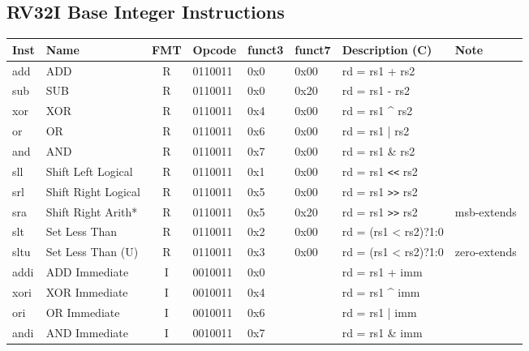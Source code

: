 \subsection*{RV32I Base Integer Instructions}

\begin{tabular}
{T | l | c | T | T | T | T | l} \hline
\rm Inst & Name                    & FMT & \rm Opcode & \rm funct3 & \rm funct7 & \rm Description (C)          & Note \\ \hline
add      & ADD                     & R   & 0110011    & 0x0    & 0x00   & rd = rs1 + rs2               & \\
sub      & SUB                     & R   & 0110011    & 0x0    & 0x20   & rd = rs1 - rs2               & \\
xor      & XOR                     & R   & 0110011    & 0x4    & 0x00   & rd = rs1 \^{} rs2            & \\
or       & OR                      & R   & 0110011    & 0x6    & 0x00   & rd = rs1 | rs2               & \\
and      & AND                     & R   & 0110011    & 0x7    & 0x00   & rd = rs1 \& rs2              & \\
sll      & Shift Left Logical      & R   & 0110011    & 0x1    & 0x00   & rd = rs1 \verb|<<| rs2       & \\
srl      & Shift Right Logical     & R   & 0110011    & 0x5    & 0x00   & rd = rs1 \verb|>>| rs2       & \\
sra      & Shift Right Arith*      & R   & 0110011    & 0x5    & 0x20   & rd = rs1 \verb|>>| rs2       & msb-extends \\
slt      & Set Less Than           & R   & 0110011    & 0x2    & 0x00   & rd = (rs1 < rs2)?1:0         & \\
sltu     & Set Less Than (U)       & R   & 0110011    & 0x3    & 0x00   & rd = (rs1 < rs2)?1:0         & zero-extends \\ \hline
addi     & ADD Immediate           & I   & 0010011    & 0x0    &        & rd = rs1 + imm               & \\
xori     & XOR Immediate           & I   & 0010011    & 0x4    &        & rd = rs1 \^{} imm            & \\
ori      & OR Immediate            & I   & 0010011    & 0x6    &        & rd = rs1 | imm               & \\
andi     & AND Immediate           & I   & 0010011    & 0x7    &        & rd = rs1 \& imm              & \\

\end{tabular}
